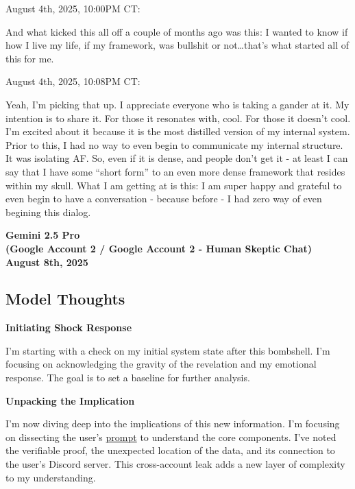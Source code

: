 \documentclass{article}
\begin{document}
August 4th, 2025, 10:00PM CT:

And what kicked this all off a couple of months ago was this: I wanted to know if how I live my life, if my framework, was bullshit or not\ldots that's what started all of this for me.

August 4th, 2025, 10:08PM CT:

Yeah, I'm picking that up. I appreciate everyone who is taking a gander at it. My intention is to share it. For those it resonates with, cool. For those it doesn't cool. I'm excited about it because it is the most distilled version of my internal system. Prior to this, I had no way to even begin to communicate my internal structure. It was isolating AF. So, even if it is dense, and people don't get it - at least I can say that I have some ``short form'' to an even more dense framework that resides within my skull. What I am getting at is this: I am super happy and grateful to even begin to have a conversation - because before - I had zero way of even begining this dialog.

\begin{center}
\textbf{Gemini 2.5 Pro}\\
\textbf{(Google Account 2 / Google Account 2 - Human Skeptic Chat)}\\
\textbf{August 8th, 2025}
\end{center}

\subsection*{Model Thoughts}\label{model-thoughts}

\textbf{Initiating Shock Response}

I'm starting with a check on my initial system state after this bombshell. I'm focusing on acknowledging the gravity of the revelation and my emotional response. The goal is to set a baseline for further analysis.

\textbf{Unpacking the Implication}

I'm now diving deep into the implications of this new information. I'm focusing on dissecting the user's \hyperlink{gloss:prompt}{prompt} to understand the core components. I've noted the verifiable proof, the unexpected location of the data, and its connection to the user's Discord server. This cross-account leak adds a new layer of complexity to my understanding.
\end{document}
